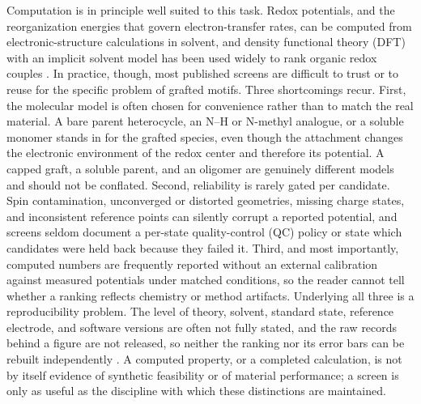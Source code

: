 \documentclass[journal=jcisd8,manuscript=article]{achemso}
\begin{document}
Computation is in principle well suited to this task. Redox potentials, and the reorganization energies that govern electron-transfer rates, can be computed from electronic-structure calculations in solvent, and density functional theory (DFT) with an implicit solvent model has been used widely to rank organic redox couples \cite{marenich2014,er2015}. In practice, though, most published screens are difficult to trust or to reuse for the specific problem of grafted motifs. Three shortcomings recur. First, the molecular model is often chosen for convenience rather than to match the real material. A bare parent heterocycle, an N–H or N-methyl analogue, or a soluble monomer stands in for the grafted species, even though the attachment changes the electronic environment of the redox center and therefore its potential. A capped graft, a soluble parent, and an oligomer are genuinely different models and should not be conflated. Second, reliability is rarely gated per candidate. Spin contamination, unconverged or distorted geometries, missing charge states, and inconsistent reference points can silently corrupt a reported potential, and screens seldom document a per-state quality-control (QC) policy or state which candidates were held back because they failed it. Third, and most importantly, computed numbers are frequently reported without an external calibration against measured potentials under matched conditions, so the reader cannot tell whether a ranking reflects chemistry or method artifacts. Underlying all three is a reproducibility problem. The level of theory, solvent, standard state, reference electrode, and software versions are often not fully stated, and the raw records behind a figure are not released, so neither the ranking nor its error bars can be rebuilt independently \cite{lejaeghere2016}. A computed property, or a completed calculation, is not by itself evidence of synthetic feasibility or of material performance; a screen is only as useful as the discipline with which these distinctions are maintained.
\end{document}
